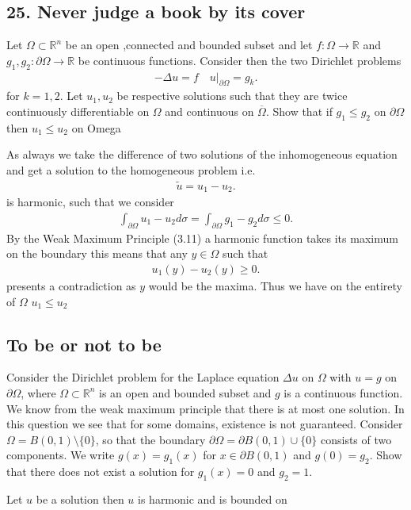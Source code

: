 \subsection*{25. Never judge a book by its cover}
Let $\Omega  \subset \mathbb{R}^{n} $ be an open ,connected and bounded subset and let 
$f : \Omega  \to \mathbb{R}$ and $g_{1},g_{2} : \partial \Omega  \to \mathbb{R}$ be continuous functions.
Consider then the two Dirichlet problems
\begin{align*}
  - \Delta u  = f \quad u \rvert_{\partial \Omega } = g_k
.\end{align*}
for $k=1,2$. Let $u_{1},u_{2}$ be respective solutions such that they are twice continuously differentiable
on $\Omega $ and continuous on $\overline{\Omega } $. Show that if $g_{1}\le g_{2}$ on $\partial \Omega $ then $u_{1}\le u_{2}$ on Omega
\begin{solution}
 As always we take the difference of two solutions of the inhomogeneous equation and get a solution to the homogeneous problem i.e.
 \begin{align*}
  \tilde{u} = u_{1} - u_{2} 
 .\end{align*}
 is harmonic, such that we consider 
 \begin{align*}
   \int_{\partial \Omega } u_{1} - u_{2} d\sigma  = \int_{\partial \Omega } g_{1}-g_{2} d\sigma  \le  0 
 .\end{align*}
 By the Weak Maximum Principle (3.11) a harmonic function takes its maximum on the boundary this means that any $y \in  \Omega $ such that 
 \begin{align*}
  u_{1}(y) - u_{2}(y) \ge 0
 .\end{align*}
 presents a contradiction as $y$ would be the maxima. Thus we have on the entirety of $\Omega $ $u_{1}\le u_{2}$
\end{solution}
\subsection*{To be or not to be}
\begin{question}
  Consider the Dirichlet problem for the Laplace equation $\Delta u$ on $\Omega $ with $u = g$ on $\partial \Omega $, where
$\Omega \subset  \mathbb{R}^{n} $ is an open and bounded subset and $g$ is a continuous function. We know from the weak
maximum principle that there is at most one solution. In this question we see that for some domains, existence is not guaranteed.
Consider $\Omega  = B(0,1) \setminus \{0\}  $, so that the boundary $\partial \Omega  = \partial B(0,1) \cup \{0\}  $ consists of two components.
We write $g(x) = g_1(x)$ for $x \in  \partial B(0,1)$ and $g(0) = g_2$. Show that there does not exist a solution
for $g_1(x) = 0$ and $g_2 = 1$.
\end{question}
\begin{solution}
 Let $u$ be a solution then $u$ is harmonic and is bounded on 
\end{solution}
